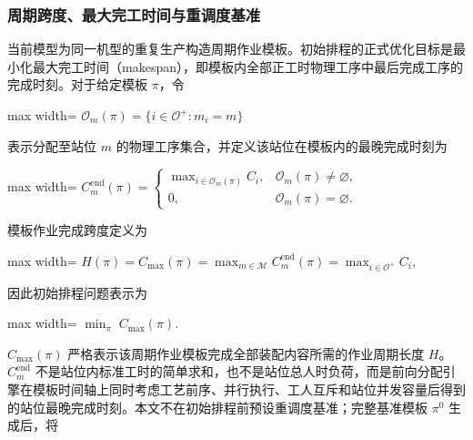 \documentclass[journal,10pt]{IEEEtran}
\begin{document}
\subsubsection{周期跨度、最大完工时间与重调度基准}\label{ux5468ux671fux8de8ux5ea6ux6700ux5927ux5b8cux5de5ux65f6ux95f4ux4e0eux91cdux8c03ux5ea6ux57faux51c6}

当前模型为同一机型的重复生产构造周期作业模板。初始排程的正式优化目标是最小化最大完工时间（makespan），即模板内全部正工时物理工序中最后完成工序的完成时刻。对于给定模板 \(\pi\)，令

\begin{center}
\begin{adjustbox}{max width=\columnwidth}
$\displaystyle
\mathcal O_m(\pi)=\{i\in\mathcal O^+:m_i=m\}
$
\end{adjustbox}
\end{center}

表示分配至站位 \(m\) 的物理工序集合，并定义该站位在模板内的最晚完成时刻为

\begin{center}
\begin{adjustbox}{max width=\columnwidth}
$\displaystyle
C_m^{\mathrm{end}}(\pi)=
\begin{cases}
\displaystyle\max_{i\in\mathcal O_m(\pi)}C_i,
&\mathcal O_m(\pi)\ne\varnothing,\\
0,&\mathcal O_m(\pi)=\varnothing.
\end{cases}
$
\end{adjustbox}
\end{center}

模板作业完成跨度定义为

\begin{center}
\begin{adjustbox}{max width=\columnwidth}
$\displaystyle
H(\pi)=C_{\max}(\pi)
=\max_{m\in\mathcal M}C_m^{\mathrm{end}}(\pi)
=\max_{i\in\mathcal O^+}C_i,
$
\end{adjustbox}
\end{center}

因此初始排程问题表示为

\begin{center}
\begin{adjustbox}{max width=\columnwidth}
$\displaystyle
\min_{\pi}\;C_{\max}(\pi).
$
\end{adjustbox}
\end{center}

\(C_{\max}(\pi)\) 严格表示该周期作业模板完成全部装配内容所需的作业周期长度 \(H\)。\(C_m^{\mathrm{end}}\) 不是站位内标准工时的简单求和，也不是站位总人时负荷，而是前向分配引擎在模板时间轴上同时考虑工艺前序、并行执行、工人互斥和站位并发容量后得到的站位最晚完成时刻。本文不在初始排程前预设重调度基准；完整基准模板 \(\pi^0\) 生成后，将
\end{document}

